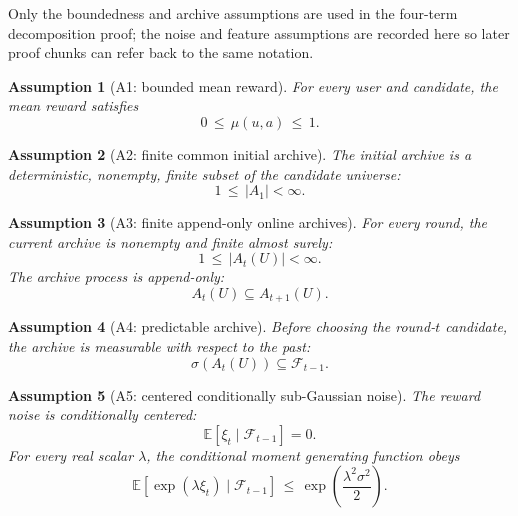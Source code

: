 \documentclass{article} %
\newtheorem{assumption}{Assumption}
\begin{document}
Only the boundedness and archive assumptions are used in the four-term decomposition proof; the noise and feature assumptions are recorded here so later proof chunks can refer back to the same notation.

\begin{assumption}[A1: bounded mean reward]
\label{ass:app-bounded}
For every user and candidate, the mean reward satisfies
\begin{equation}
\label{eq:app-ass-bounded}
0 \,\le\, \mu(u,a) \,\le\, 1.
\end{equation}
\end{assumption}

\begin{assumption}[A2: finite common initial archive]
\label{ass:app-finite-initial}
The initial archive is a deterministic, nonempty, finite subset of the candidate universe:
\begin{equation}
\label{eq:app-ass-initial-finite}
1 \,\le\, |A_1| < \infty.
\end{equation}
\end{assumption}

\begin{assumption}[A3: finite append-only online archives]
\label{ass:app-append-only}
For every round, the current archive is nonempty and finite almost surely:
\begin{equation}
\label{eq:app-ass-current-finite}
1 \,\le\, |A_t(U)| < \infty.
\end{equation}
The archive process is append-only:
\begin{equation}
\label{eq:app-ass-append-only}
A_t(U)\subseteq A_{t+1}(U).
\end{equation}
\end{assumption}

\begin{assumption}[A4: predictable archive]
\label{ass:app-predictable}
Before choosing the round-\(t\) candidate, the archive is measurable with respect to the past:
\begin{equation}
\label{eq:app-ass-predictable}
\sigma(A_t(U)) \subseteq \mathcal{F}_{t-1}.
\end{equation}
\end{assumption}

\begin{assumption}[A5: centered conditionally sub-Gaussian noise]
\label{ass:app-noise}
The reward noise is conditionally centered:
\begin{equation}
\label{eq:app-ass-noise-mean}
\mathbb{E}[\xi_t\mid \mathcal{F}_{t-1}] = 0.
\end{equation}
For every real scalar \(\lambda\), the conditional moment generating function obeys
\begin{equation}
\label{eq:app-ass-noise-subg}
\mathbb{E}\!\left[\exp(\lambda \xi_t)\mid \mathcal{F}_{t-1}\right]
\,\le\,
\exp\!\left(\frac{\lambda^2\sigma^2}{2}\right).
\end{equation}
\end{assumption}
\end{document}
